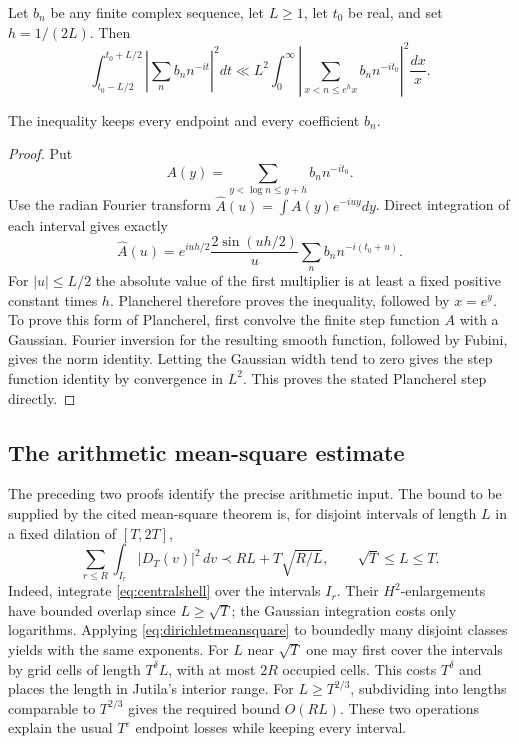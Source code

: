 \begin{lemma}
\label{lem:dirichletGallagher}
Let $b_n$ be any finite complex sequence, let $L\ge1$, let $t_0$ be
real, and set $h=1/(2L)$. Then
\begin{equation}\label{eq:shortfrequency}
 \int_{t_0-L/2}^{t_0+L/2}
       \left|\sum_n b_n n^{-it}\right|^2dt
 \ll L^2\int_0^\infty
       \left|\sum_{x<n\le e^h x}b_n n^{-it_0}\right|^2\frac{dx}{x}.
\end{equation}
\end{lemma}
The inequality keeps every endpoint and every coefficient $b_n$.
\begin{proof}
Put
\[
 A(y)=\sum_{y<\log n\le y+h}b_n n^{-it_0}.
\]
Use the radian Fourier transform $\widehat A(u)=\int A(y)e^{-iuy}dy$.
Direct integration of each interval gives exactly
\[
 \widehat A(u)=e^{iuh/2}\frac{2\sin(uh/2)}u
                  \sum_n b_n n^{-i(t_0+u)}.
\]
For $|u|\le L/2$ the absolute value of the first multiplier is
at least a fixed positive constant times $h$.
Plancherel therefore proves the inequality, followed by $x=e^y$.
To prove this form of Plancherel, first convolve
the finite step function $A$ with a Gaussian. Fourier inversion for
the resulting smooth function, followed by Fubini, gives the norm
identity. Letting the Gaussian width tend to zero gives the step
function identity by convergence in $L^2$. This proves the stated Plancherel step directly.
\end{proof}

\subsection{The arithmetic mean-square estimate}
The preceding two proofs identify the precise arithmetic input.
The bound to be supplied by the cited mean-square theorem is,
for disjoint intervals of
length $L$ in a fixed dilation of $[T,2T]$,
\begin{equation}\label{eq:dirichletmeansquare}
 \sum_{r\le R}\int_{I_r}|D_T(v)|^2\,dv
 \prec RL+T\sqrt{R/L},\qquad \sqrt T\le L\le T.
\end{equation}
Indeed, integrate \eqref{eq:centralshell} over the intervals $I_r$.
Their $H^2$-enlargements have bounded overlap since $L\ge\sqrt T$;
the Gaussian integration costs only logarithms. Applying
\eqref{eq:dirichletmeansquare} to boundedly many disjoint classes yields
\cite[(\ref*{six-eq:basefourth})]{Weighted} with the same exponents.
For $L$ near $\sqrt T$ one may first cover the intervals by grid cells
of length $T^\delta L$, with at most $2R$ occupied cells. This costs
$T^\delta$ and places the length in Jutila's interior range.
For $L\ge T^{2/3}$, subdividing into lengths comparable to $T^{2/3}$
gives the required bound $O(RL)$. These two operations explain the
usual $T^\varepsilon$ endpoint losses while keeping every interval.

